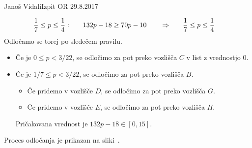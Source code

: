 \begin{naloga}{Janoš Vidali}{Izpit OR 29.8.2017}
\begin{odgovor}
\begin{alignat*}{4}
{1 \over 7} &\le p \le {1 \over 4}: &\quad 132p - 18 &\ge 70p - 10
&\quad&\Rightarrow\quad & {1 \over 7} &\le p \le {1 \over 4}
\end{alignat*}
Odločamo se torej po sledečem pravilu.
\begin{itemize}
\item Če je $0 \le p < 3/22$,
se odločimo za pot preko vozlišča $C$ v list z vrednostjo $0$.
\item Če je $1/7 \le p < 3/22$,
se odločimo za pot preko vozlišča $B$.
    \begin{itemize}
    \item Če pridemo v vozlišče $D$, se odločimo za pot preko vozlišča $G$.
    \item Če pridemo v vozlišče $E$, se odločimo za pot preko vozlišča $H$.
    \end{itemize}
Pričakovana vrednost je $132p - 18 \in [0, 15]$.
\end{itemize}
Proces odločanja je prikazan na sliki~.

\begin{slika}
\end{slika}
\end{odgovor}
\end{naloga}
